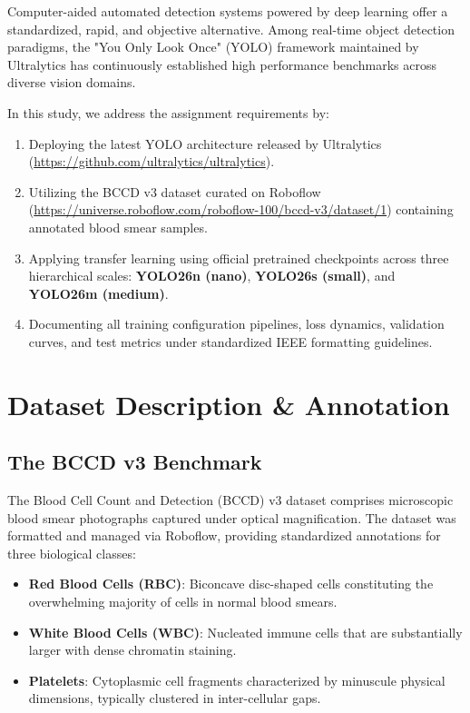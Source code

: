\documentclass[conference]{IEEEtran}
\begin{document}
Computer-aided automated detection systems powered by deep learning offer a standardized, rapid, and objective alternative. Among real-time object detection paradigms, the "You Only Look Once" (YOLO) framework maintained by Ultralytics has continuously established high performance benchmarks across diverse vision domains.

In this study, we address the assignment requirements by:
\begin{enumerate}
    \item Deploying the latest YOLO architecture released by Ultralytics (\url{https://github.com/ultralytics/ultralytics}).
    \item Utilizing the BCCD v3 dataset curated on Roboflow (\url{https://universe.roboflow.com/roboflow-100/bccd-v3/dataset/1}) containing annotated blood smear samples.
    \item Applying transfer learning using official pretrained checkpoints across three hierarchical scales: \textbf{YOLO26n (nano)}, \textbf{YOLO26s (small)}, and \textbf{YOLO26m (medium)}.
    \item Documenting all training configuration pipelines, loss dynamics, validation curves, and test metrics under standardized IEEE formatting guidelines.
\end{enumerate}

\section{Dataset Description \& Annotation}
\subsection{The BCCD v3 Benchmark}
The Blood Cell Count and Detection (BCCD) v3 dataset comprises microscopic blood smear photographs captured under optical magnification. The dataset was formatted and managed via Roboflow, providing standardized annotations for three biological classes:
\begin{itemize}
    \item \textbf{Red Blood Cells (RBC)}: Biconcave disc-shaped cells constituting the overwhelming majority of cells in normal blood smears.
    \item \textbf{White Blood Cells (WBC)}: Nucleated immune cells that are substantially larger with dense chromatin staining.
    \item \textbf{Platelets}: Cytoplasmic cell fragments characterized by minuscule physical dimensions, typically clustered in inter-cellular gaps.
\end{itemize}
\end{document}
